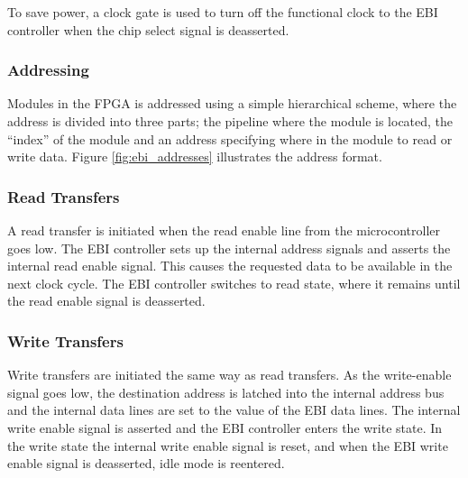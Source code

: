 To save power, a clock gate is used to turn off the functional clock to
the EBI controller when the chip select signal is deasserted.



\subsubsection{Addressing}

Modules in the FPGA is addressed using a simple hierarchical scheme, where the
address is divided into three parts; the pipeline where the module is located,
the ``index'' of the module and an address specifying where in the module to
read or write data. Figure \ref{fig:ebi_addresses} illustrates the address
format.



\FloatBarrier
\subsubsection{Read Transfers}

A read transfer is initiated when the read enable line from the microcontroller goes low.
The EBI controller sets up the internal address signals and asserts the internal read enable
signal. This causes the requested data to be available in the next clock cycle. The EBI
controller switches to read state, where it remains until the read enable signal is deasserted.

\subsubsection{Write Transfers}

Write transfers are initiated the same way as read transfers. As the write-enable signal goes
low, the destination address is latched into the internal address bus and the internal data
lines are set to the value of the EBI data lines. The internal write enable signal is asserted
and the EBI controller enters the write state. In the write state the internal write enable
signal is reset, and when the EBI write enable signal is deasserted, idle mode is reentered.


